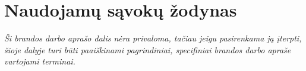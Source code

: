 \section{Naudojamų sąvokų žodynas}
\textit{Ši brandos darbo aprašo dalis nėra privaloma, tačiau jeigu pasirenkama ją įterpti, šioje dalyje turi būti paaiškinami pagrindiniai, specifiniai brandos darbo apraše vartojami terminai.}
\lipsum[2]